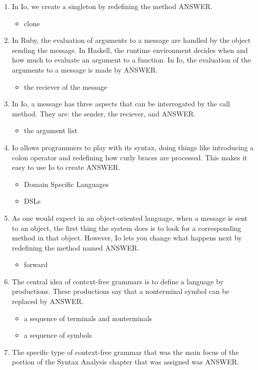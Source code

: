 \documentclass{exam}
\begin{document}
\begin{enumerate}
\begin{itemize}
\end{itemize}
\item In Io, we create a singleton by redefining the method ANSWER.
\begin{itemize}
\item clone
\end{itemize}
\item In Ruby, the evaluation of arguments to a message are handled by the object sending the message.  In Haskell, the runtime environment decides when and how much to evaluate an argument to a function.  In Io, the evaluation of the arguments to a message is made by ANSWER.
\begin{itemize}
\item the reciever of the message
\end{itemize}
\item In Io, a message has three aspects that can be interrogated by the call method.  They are: the sender, the reciever, and ANSWER.
\begin{itemize}
\item the argument list
\end{itemize}
\item Io allows programmers to play with its syntax, doing things like introducing a colon operator and redefining how curly braces are processed.  This makes it easy to use Io to create ANSWER.
\begin{itemize}
\item Domain Specific Languages
\item DSLs
\end{itemize}
\item As one would expect in an object-oriented language, when a message is sent to an object, the first thing the system does is to look for a corresponding method in that object.  However, Io lets you change what happens next by redefining the method named ANSWER.
\begin{itemize}
\item forward
\end{itemize}
\item The central idea of context-free grammars is to define a language by productions.  These productions say that a nonterminal symbol can be replaced by ANSWER.
\begin{itemize}
\item a sequence of terminals and nonterminals
\item a sequence of symbols
\end{itemize}
\item The specific type of context-free grammar that was the main focus of the portion of the Syntax Analysis chapter that was assigned was ANSWER.

\end{enumerate}
\end{document}
